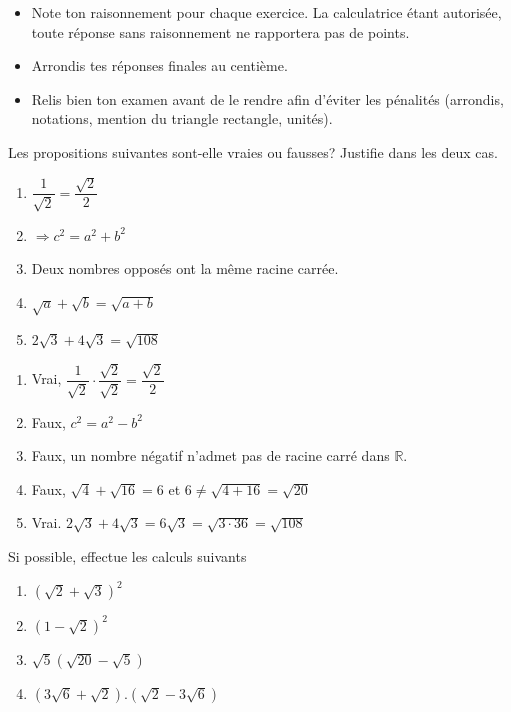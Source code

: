 \documentclass[a4paper, 12pt, parskip=half-]{scrartcl}
\begin{document}
\entete
{}
\begin{itemize}
    \item Note ton raisonnement pour chaque exercice. La calculatrice étant autorisée, toute réponse sans raisonnement ne rapportera pas de points.
    \item Arrondis tes réponses finales au centième.
    \item Relis bien ton examen avant de le rendre afin d'éviter les pénalités (arrondis, notations, mention du triangle rectangle, unités).
\end{itemize}
\newpage
\begin{exercise}[points=5]
    Les propositions suivantes sont-elle vraies ou fausses? Justifie dans les deux cas.
    \begin{enumerate}
        \item $\dfrac{1}{\sqrt{2}}=\dfrac{\sqrt{2}}{2}$
        \item  $\Rightarrow c^2 = a^2+b^2$
        \item Deux nombres opposés ont la même racine carrée.
        \item $\sqrt{a} + \sqrt{b} = \sqrt{a+b}$
        \item $2\sqrt{3} + 4\sqrt{3} = \sqrt{108}$
    \end{enumerate}
\end{exercise}

\begin{solution}
    \begin{enumerate}
        \item Vrai, $\dfrac{1}{\sqrt{2}}\cdot\dfrac{\sqrt{2}}{\sqrt{2}} = \dfrac{\sqrt{2}}{2}$
        \item Faux, $c^2 = a^2 - b^2$
        \item Faux, un nombre négatif n'admet pas de racine carré dans $\mathbb{R}$.
        \item Faux, $\sqrt{4} + \sqrt{16} = 6$ et $6\ne \sqrt{4+16}=\sqrt{20}$
        \item Vrai. $2\sqrt{3} + 4\sqrt{3} = 6\sqrt{3} = \sqrt{3\cdot 36} = \sqrt{108}$
    \end{enumerate}
\end{solution}
\begin{exercise}[points=4]
    Si possible, effectue les calculs suivants
    \begin{enumerate}[cols=2]
        \item $(\sqrt{2}+\sqrt{3})^2$
        \item $(1-\sqrt{2})^2$
        \item $\sqrt{5}\left(\sqrt{20} - \sqrt{5}\right)$
        \item $(3\sqrt{6}+\sqrt{2}).(\sqrt{2}-3\sqrt{6})$
    \end{enumerate}
\end{exercise}
\end{document}
